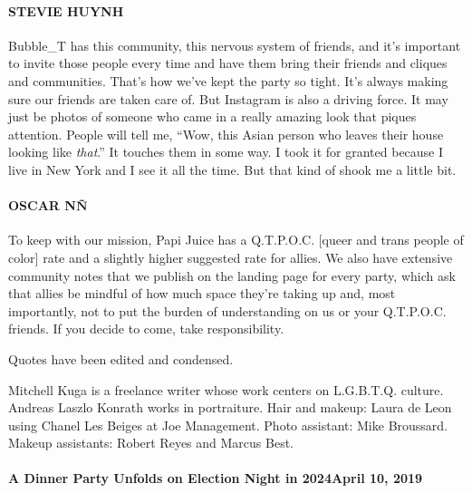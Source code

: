 \hypertarget{stevie-huynh-2}{%
\paragraph{STEVIE HUYNH}\label{stevie-huynh-2}}

Bubble\_T has this community, this nervous system of friends, and it's
important to invite those people every time and have them bring their
friends and cliques and communities. That's how we've kept the party so
tight. It's always making sure our friends are taken care of. But
Instagram is also a driving force. It may just be photos of someone who
came in a really amazing look that piques attention. People will tell
me, ``Wow, this Asian person who leaves their house looking like
\emph{that}.'' It touches them in some way. I took it for granted
because I live in New York and I see it all the time. But that kind of
shook me a little bit.

\hypertarget{oscar-nuxf1-2}{%
\paragraph{OSCAR NÑ}\label{oscar-nuxf1-2}}

To keep with our mission, Papi Juice has a Q.T.P.O.C. {[}queer and trans
people of color{]} rate and a slightly higher suggested rate for allies.
We also have extensive community notes that we publish on the landing
page for every party, which ask that allies be mindful of how much space
they're taking up and, most importantly, not to put the burden of
understanding on us or your Q.T.P.O.C. friends. If you decide to come,
take responsibility.

Quotes have been edited and condensed.

Mitchell Kuga is a freelance writer whose work centers on L.G.B.T.Q.
culture. Andreas Laszlo Konrath works in portraiture. Hair and makeup:
Laura de Leon using Chanel Les Beiges at Joe Management. Photo
assistant: Mike Broussard. Makeup assistants: Robert Reyes and Marcus
Best.

\href{https://www.nytimes.com/interactive/2019/04/10/t-magazine/humberto-leon-carol-lim.html}{}

\hypertarget{a-dinner-party-unfolds-on-election-night-in-2024april-10-2019}{%
\paragraph{A Dinner Party Unfolds on Election Night in 2024April 10,
2019}\label{a-dinner-party-unfolds-on-election-night-in-2024april-10-2019}}

